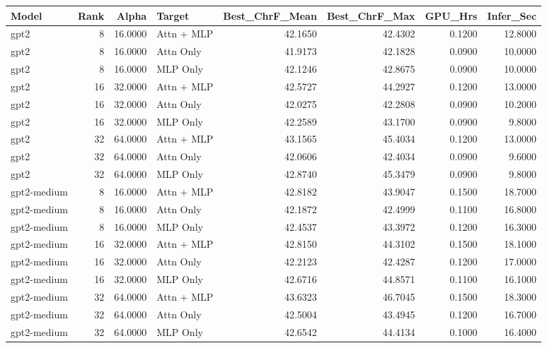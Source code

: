 \begin{tabular}{lrrlrrrr}
\toprule
Model & Rank & Alpha & Target & Best_ChrF_Mean & Best_ChrF_Max & GPU_Hrs & Infer_Sec \\
\midrule
gpt2 & 8 & 16.0000 & Attn + MLP & 42.1650 & 42.4302 & 0.1200 & 12.8000 \\
gpt2 & 8 & 16.0000 & Attn Only & 41.9173 & 42.1828 & 0.0900 & 10.0000 \\
gpt2 & 8 & 16.0000 & MLP Only & 42.1246 & 42.8675 & 0.0900 & 10.0000 \\
gpt2 & 16 & 32.0000 & Attn + MLP & 42.5727 & 44.2927 & 0.1200 & 13.0000 \\
gpt2 & 16 & 32.0000 & Attn Only & 42.0275 & 42.2808 & 0.0900 & 10.2000 \\
gpt2 & 16 & 32.0000 & MLP Only & 42.2589 & 43.1700 & 0.0900 & 9.8000 \\
gpt2 & 32 & 64.0000 & Attn + MLP & 43.1565 & 45.4034 & 0.1200 & 13.0000 \\
gpt2 & 32 & 64.0000 & Attn Only & 42.0606 & 42.4034 & 0.0900 & 9.6000 \\
gpt2 & 32 & 64.0000 & MLP Only & 42.8740 & 45.3479 & 0.0900 & 9.8000 \\
gpt2-medium & 8 & 16.0000 & Attn + MLP & 42.8182 & 43.9047 & 0.1500 & 18.7000 \\
gpt2-medium & 8 & 16.0000 & Attn Only & 42.1872 & 42.4999 & 0.1100 & 16.8000 \\
gpt2-medium & 8 & 16.0000 & MLP Only & 42.4537 & 43.3972 & 0.1200 & 16.3000 \\
gpt2-medium & 16 & 32.0000 & Attn + MLP & 42.8150 & 44.3102 & 0.1500 & 18.1000 \\
gpt2-medium & 16 & 32.0000 & Attn Only & 42.2123 & 42.4287 & 0.1200 & 17.0000 \\
gpt2-medium & 16 & 32.0000 & MLP Only & 42.6716 & 44.8571 & 0.1100 & 16.1000 \\
gpt2-medium & 32 & 64.0000 & Attn + MLP & 43.6323 & 46.7045 & 0.1500 & 18.3000 \\
gpt2-medium & 32 & 64.0000 & Attn Only & 42.5004 & 43.4945 & 0.1200 & 16.7000 \\
gpt2-medium & 32 & 64.0000 & MLP Only & 42.6542 & 44.4134 & 0.1000 & 16.4000 \\
\bottomrule
\end{tabular}
